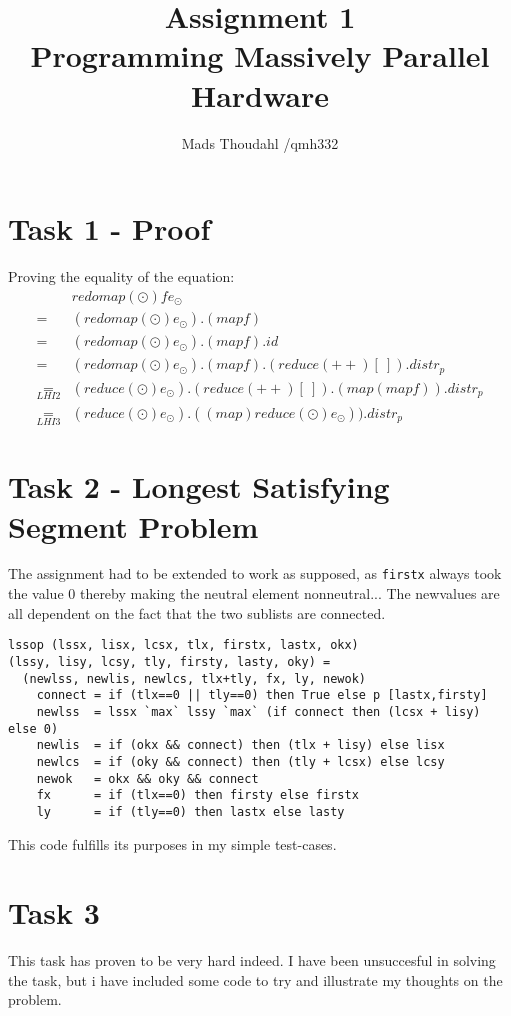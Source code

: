 \documentclass[a4paper,10pt]{article}
\title{Assignment 1  \\Programming Massively Parallel Hardware }
\author{Mads Thoudahl /qmh332}
\begin{document}
\maketitle

\section{Task 1 - Proof}
Proving the equality of the equation:
\begin{align}
  &  redomap (\odot) f e_{\odot} \\
  =& (redomap (\odot) e_{\odot}) . (map f ) \\
  =& (redomap (\odot) e_{\odot}) . (map f ) . id  \\
  =& (redomap (\odot) e_{\odot}) . (map f ) . (reduce (++) [~]) . distr_p  \\
  \underset{LHI2}{=}& (reduce (\odot) e_{\odot}) . (reduce (++) [~]) . ( map (map f )).distr_p \\
  \underset{LHI3}{=}& (reduce (\odot) e_{\odot}) . ((map) reduce (\odot)  e_{\odot})) . distr_{p}
\end{align}

\vfill

\section{Task 2 - Longest Satisfying Segment Problem }
The assignment had to be extended to work as supposed, as \texttt{firstx} always took the value 0 thereby making the neutral element nonneutral...
The newvalues are all dependent on the fact that the two sublists are connected.
\begin{verbatim}
lssop (lssx, lisx, lcsx, tlx, firstx, lastx, okx)
(lssy, lisy, lcsy, tly, firsty, lasty, oky) =
  (newlss, newlis, newlcs, tlx+tly, fx, ly, newok)
    connect = if (tlx==0 || tly==0) then True else p [lastx,firsty]
    newlss  = lssx `max` lssy `max` (if connect then (lcsx + lisy) else 0)
    newlis  = if (okx && connect) then (tlx + lisy) else lisx
    newlcs  = if (oky && connect) then (tly + lcsx) else lcsy
    newok   = okx && oky && connect
    fx      = if (tlx==0) then firsty else firstx
    ly      = if (tly==0) then lastx else lasty
\end{verbatim}
This code fulfills its purposes in my simple test-cases.
\vfill

\newpage

\section{Task 3}
This task has proven to be very hard indeed.
I have been unsuccesful in solving the task, but i have included some code to try and illustrate my thoughts on the problem.
\end{document}
